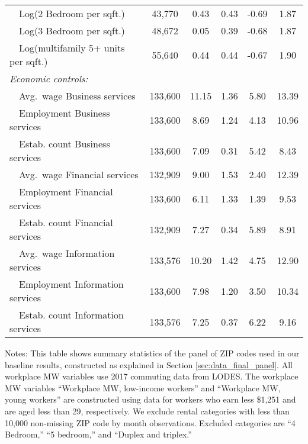 \begin{table}[hbt!]
\begin{tabular}{@{}lccccc@{}}
        $\quad$Log(2 Bedroom per sqft.)               & 43,770  & 0.43  & 0.43  & -0.69  & 1.87  \\
        $\quad$Log(3 Bedroom per sqft.)               & 48,672  & 0.05  & 0.39  & -0.68  & 1.87  \\
        $\quad$Log(multifamily 5+ units per sqft.)    & 55,640  & 0.44  & 0.44  & -0.67  & 1.90  \\[.3em]
        \textit{Economic controls:}                   &       &       &       &       &       \\
        $\quad$Avg.\ wage Business services           & 133,600  & 11.15  & 1.36  & 5.80  & 13.39  \\
        $\quad$Employment Business services           & 133,600  & 8.69  & 1.24  & 4.13  & 10.96  \\
        $\quad$Estab. count Business services         & 133,600  & 7.09  & 0.31  & 5.42  & 8.43  \\
        $\quad$Avg.\ wage Financial services          & 132,909  & 9.00  & 1.53  & 2.40  & 12.39  \\
        $\quad$Employment Financial services          & 133,600  & 6.11  & 1.33  & 1.39  & 9.53  \\
        $\quad$Estab. count Financial services        & 132,909  & 7.27  & 0.34  & 5.89  & 8.91  \\
        $\quad$Avg.\ wage Information services        & 133,576  & 10.20  & 1.42  & 4.75  & 12.90  \\
        $\quad$Employment Information services        & 133,600  & 7.98  & 1.20  & 3.50  & 10.34  \\
        $\quad$Estab. count Information services      & 133,576  & 7.25  & 0.37  & 6.22  & 9.16  \\ \bottomrule
    \end{tabular}

    \begin{minipage}{.95\textwidth} \footnotesize
        \vspace{2mm}
        Notes: This table shows summary statistics of the panel of ZIP codes 
        used in our baseline results, constructed as explained in Section 
        \ref{sec:data_final_panel}.
        All workplace MW variables use 2017 commuting data from LODES.
        The workplace MW variables ``Workplace MW, low-income workers'' and 
        ``Workplace MW, young workers'' are constructed using data for 
        workers who earn less \$1,251 and are aged less than 29, respectively.
        We exclude rental categories with less than 10,000 non-missing ZIP code 
        by month observations.
        Excluded categories are ``4 Bedroom,'' ``5 bedroom,'' and 
        ``Duplex and triplex.''
    \end{minipage}
\end{table}
